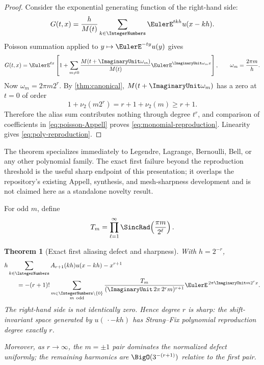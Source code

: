 \documentclass[11pt,oneside]{article}
\newtheorem{theorem}{Theorem}[section]
\theoremstyle{definition}
\theoremstyle{remark}
\begin{document}
\begin{proof}
Consider the exponential generating function of the right-hand side:
\[
 G(t,x)
 =\frac h{M(t)}
  \sum_{k\in\IntegerNumbers}\EulerE^{tkh}u(x-kh).
\]
Poisson summation applied to \(y\mapsto\EulerE^{-ty}u(y)\) gives
\begin{equation}
 G(t,x)
 =\EulerE^{tx}
 \left[
  1+\sum_{m\neq0}
   \frac{M(t+\ImaginaryUnit\omega_m)}{M(t)}
   \EulerE^{\ImaginaryUnit\omega_mx}
 \right],
 \qquad
 \omega_m=\frac{2\pi m}{h}.
 \label{eq:poisson-Appell}
\end{equation}
Now \(\omega_m=2\pi m2^r\).  By \cref{thm:canonical},
\(M(t+\ImaginaryUnit\omega_m)\) has a zero at \(t=0\) of order
\[
 1+\nu_2(m2^r)=r+1+\nu_2(m)\geq r+1.
\]
Therefore the alias sum contributes nothing through degree \(t^r\), and
comparison of coefficients in \eqref{eq:poisson-Appell} proves
\eqref{eq:monomial-reproduction}.  Linearity gives
\eqref{eq:poly-reproduction}.
\end{proof}

The theorem specializes immediately to Legendre, Lagrange, Bernoulli, Bell,
or any other polynomial family.  The exact first failure beyond the
reproduction threshold is the useful sharp endpoint of this presentation; it
overlaps the repository's existing Appell, synthesis, and mesh-sharpness
development and is not claimed here as a standalone novelty result.

For odd \(m\), define
\begin{equation}
 T_m=\prod_{\ell=1}^{\infty}
 \SincRad\!\left(\frac{\pi m}{2^\ell}\right).
 \label{eq:Tm}
\end{equation}

\begin{theorem}[Exact first aliasing defect and sharpness]
\label{thm:alias-defect}
With \(h=2^{-r}\),
\begin{align}
 &h\sum_{k\in\IntegerNumbers}A_{r+1}(kh)u(x-kh)-x^{r+1}
 \notag\\
 &\qquad=
 -(r+1)!
 \sum_{\substack{m\in\IntegerNumbers\setminus\{0\}\\m\ {\rm odd}}}
 \frac{T_m}
      {(\ImaginaryUnit\,2\pi\,2^r m)^{r+1}}
 \EulerE^{\,2\pi\ImaginaryUnit m2^rx}.
 \label{eq:first-alias}
\end{align}
The right-hand side is not identically zero.  Hence degree \(r\) is sharp:
the shift-invariant space generated by \(u(\,\cdot-kh)\) has Strang--Fix
polynomial reproduction degree exactly \(r\).

Moreover, as \(r\to\infty\), the \(m=\pm1\) pair dominates the normalized
defect uniformly; the remaining harmonics are
\(\BigO(3^{-(r+1)})\) relative to the first pair.
\end{theorem}
\end{document}
